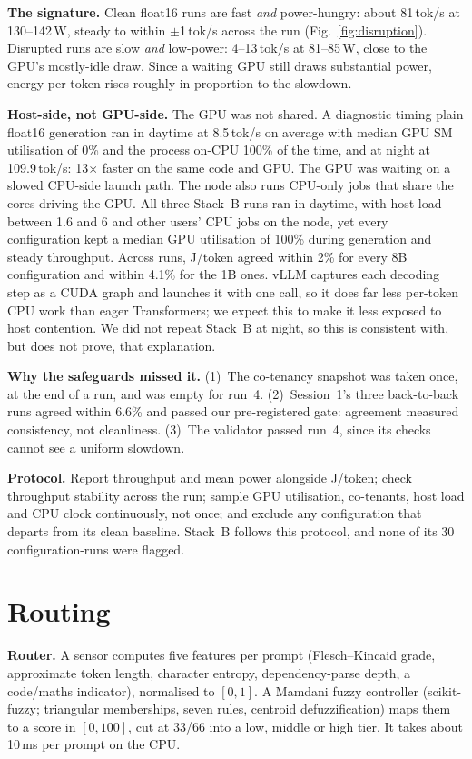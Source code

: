 \documentclass[conference]{IEEEtran}
\begin{document}
\textbf{The signature.} Clean float16 runs are fast \emph{and} power-hungry: about 81\,tok/s at 130--142\,W, steady to within $\pm$1\,tok/s across the run (Fig.~\ref{fig:disruption}). Disrupted runs are slow \emph{and} low-power: 4--13\,tok/s at 81--85\,W, close to the GPU's mostly-idle draw. Since a waiting GPU still draws substantial power, energy per token rises roughly in proportion to the slowdown.

\textbf{Host-side, not GPU-side.} The GPU was not shared. A diagnostic timing plain float16 generation ran in daytime at 8.5\,tok/s on average with median GPU SM utilisation of 0\% and the process on-CPU 100\% of the time, and at night at 109.9\,tok/s: 13$\times$ faster on the same code and GPU. The GPU was waiting on a slowed CPU-side launch path. The node also runs CPU-only jobs that share the cores driving the GPU. All three Stack~B runs ran in daytime, with host load between 1.6 and 6 and other users' CPU jobs on the node, yet every configuration kept a median GPU utilisation of 100\% during generation and steady throughput. Across runs, J/token agreed within 2\% for every 8B configuration and within 4.1\% for the 1B ones. vLLM captures each decoding step as a CUDA graph and launches it with one call, so it does far less per-token CPU work than eager Transformers; we expect this to make it less exposed to host contention. We did not repeat Stack~B at night, so this is consistent with, but does not prove, that explanation.

\textbf{Why the safeguards missed it.} (1)~The co-tenancy snapshot was taken once, at the end of a run, and was empty for run~4. (2)~Session~1's three back-to-back runs agreed within 6.6\% and passed our pre-registered gate: agreement measured consistency, not cleanliness. (3)~The validator passed run~4, since its checks cannot see a uniform slowdown.

\textbf{Protocol.} Report throughput and mean power alongside J/token; check throughput stability across the run; sample GPU utilisation, co-tenants, host load and CPU clock continuously, not once; and exclude any configuration that departs from its clean baseline. Stack~B follows this protocol, and none of its 30 configuration-runs were flagged.

\section{Routing}
\label{sec:routing}
\textbf{Router.} A sensor computes five features per prompt (Flesch--Kincaid grade, approximate token length, character entropy, dependency-parse depth, a code/maths indicator), normalised to $[0,1]$. A Mamdani fuzzy controller (scikit-fuzzy; triangular memberships, seven rules, centroid defuzzification) maps them to a score in $[0,100]$, cut at 33/66 into a low, middle or high tier. It takes about 10\,ms per prompt on the CPU.
\end{document}
